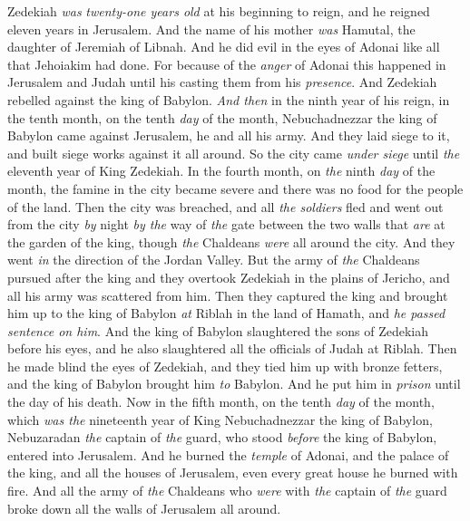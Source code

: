 \begin{biblechapter} %
 Zedekiah \textit{was} \textit{twenty-one years old} at his beginning to reign, and he reigned eleven years in Jerusalem. And the name of his mother \textit{was} Hamutal, the daughter of Jeremiah of Libnah.
\verse And he did evil in the eyes of Adonai like all that Jehoiakim had done.
\verse For because of the \textit{anger} of Adonai this happened in Jerusalem and Judah until his casting them from his \textit{presence}. And Zedekiah rebelled against the king of Babylon.
\verse \textit{And then} in the ninth year of his reign, in the tenth month, on the tenth \textit{day} of the month, Nebuchadnezzar the king of Babylon came against Jerusalem, he and all his army. And they laid siege to it, and built siege works against it all around.
\verse So the city came \textit{under siege} until \textit{the} eleventh year of King Zedekiah.
\verse In the fourth month, on \textit{the} ninth \textit{day} of the month, the famine in the city became severe and there was no food for the people of the land.
\verse Then the city was breached, and all \textit{the soldiers} fled and went out from the city \textit{by} night \textit{by the} way of \textit{the} gate between the two walls that \textit{are} at the garden of the king, though \textit{the} Chaldeans \textit{were} all around the city. And they went \textit{in} the direction of the Jordan Valley.
\verse But the army of \textit{the} Chaldeans pursued after the king and they overtook Zedekiah in the plains of Jericho, and all his army was scattered from him.
\verse Then they captured the king and brought him up to the king of Babylon \textit{at} Riblah in the land of Hamath, and \textit{he passed sentence on him}.
\verse And the king of Babylon slaughtered the sons of Zedekiah before his eyes, and he also slaughtered all the officials of Judah at Riblah.
\verse Then he made blind the eyes of Zedekiah, and they tied him up with bronze fetters, and the king of Babylon brought him \textit{to} Babylon. And he put him in \textit{prison} until the day of his death.
\verse Now in the fifth month, on the tenth \textit{day} of the month, which \textit{was the} nineteenth year of King Nebuchadnezzar the king of Babylon, Nebuzaradan \textit{the} captain of \textit{the} guard, who stood \textit{before} the king of Babylon, entered into Jerusalem.
\verse And he burned the \textit{temple} of Adonai, and the palace of the king, and all the houses of Jerusalem, even every great house he burned with fire.
\verse And all the army of \textit{the} Chaldeans who \textit{were} with \textit{the} captain of \textit{the} guard broke down all the walls of Jerusalem all around.

\end{biblechapter}

